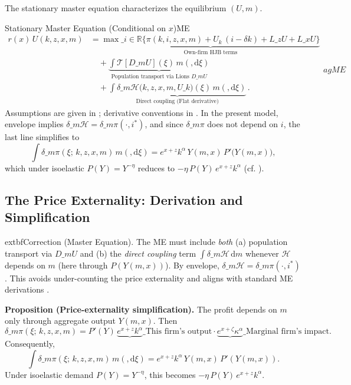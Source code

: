 \documentclass[11pt,letterpaper,oneside]{article}
\numberwithin{equation}{section}
\newcommand{\R}{\mathbb{R}}
\newcommand{\1}{\mathbf{1}}
\newcommand{\diff}{,\mathrm{d}}
\newcommand{\Lz}{L\_z}
\newcommand{\Lx}{L\_x}
\newcommand{\dmU}{D\_m U}
\newcommand{\Dm}{D\_m}
\begin{document}
The stationary master equation characterizes the equilibrium $(U,m)$.

\begin{theorem}{Stationary Master Equation (Conditional on $x$)}{ME}
\begin{equation}
\boxed{\begin{aligned}
r(x)\,U(k,z,x,m) &= \underbrace{\max\_{i\in\R}\big\{\pi(k,i,z,x,m) + U_k\,(i-\delta k) + \Lz U + \Lx U\big\}}_{\text{Own-firm HJB terms}} \\
&\quad + \underbrace{\int \mathcal{T}[\dmU](\xi)\, m(\diff \xi)}_{\text{Population transport via Lions $\Dm U$}} \\
&\quad + \underbrace{\int \delta\_m \mathcal H\big(k,z,x,m,U\_k\big)(\xi)\, m(\diff \xi)}_{\text{Direct coupling (Flat derivative)}}\,.
\end{aligned}}
  	ag{ME}\label{eq:ME}
\end{equation}
Assumptions are given in ; derivative conventions in . In the present model, envelope implies $\delta\_m \mathcal H=\delta\_m \pi(\cdot,i^*)$, and since $\delta\_m \pi$ does not depend on $i$, the last line simplifies to
\[
\int \delta\_m \pi(\xi;\,k,z,x,m)\, m(\diff \xi)
= e^{x+z}k^\alpha\, Y(m,x)\,P'\!\big(Y(m,x)\big),
\]
which under isoelastic $P(Y)=Y^{-\eta}$ reduces to $-\eta\,P(Y)\,e^{x+z}k^\alpha$ (cf. ).
\end{theorem}

\subsection{The Price Externality: Derivation and Simplification}\label{sec:me-externality}

\begin{tcolorbox}[mathstyle]
	extbf{Correction (Master Equation).} The ME must include \emph{both} (a) population transport via $\Dm U$ and (b) the \emph{direct coupling} term $\int \delta\_m \mathcal H\,\mathrm dm$ whenever $\mathcal H$ depends on $m$ (here through $P(Y(m,x))$). By envelope, $\delta\_m \mathcal H=\delta\_m \pi(\cdot,i^*)$. This avoids under-counting the price externality and aligns with standard ME derivations \cite{carmona_delarue_2018_mfg,cardaliaguet_delarue_lasry_lions_2019}.
\end{tcolorbox}

\begin{tcolorbox}[mathstyle]
\textbf{Proposition (Price-externality simplification).}\label{prop:externality}
The profit depends on $m$ only through aggregate output $Y(m,x)$. Then
\[
\delta\_m \pi(\xi;\,k,z,x,m)= P'(Y)\,\underbrace{e^{x+z}k^\alpha}\_{\text{This firm's output}}\cdot \underbrace{e^{x+\zeta}\kappa^\alpha}\_{\text{Marginal firm's impact}}.
\]
Consequently,
\[
\int \delta\_m \pi(\xi;\,k,z,x,m)\, m(\diff \xi)
= e^{x+z}k^\alpha\,Y(m,x)\,P'(Y(m,x)).
\]
Under isoelastic demand $P(Y)=Y^{-\eta}$, this becomes $-\eta\,P(Y)\,e^{x+z}k^\alpha$.
\end{tcolorbox}
\end{document}
